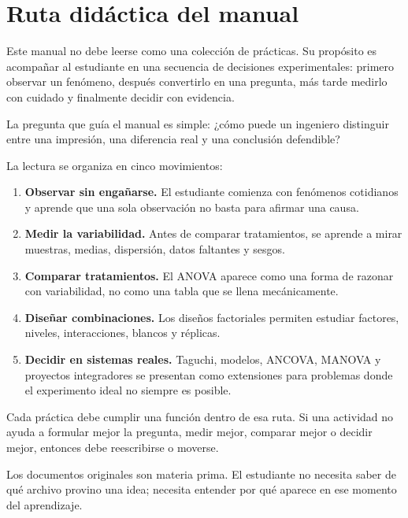 \section*{Ruta didáctica del manual}

Este manual no debe leerse como una colección de prácticas. Su propósito es acompañar al estudiante en una secuencia de decisiones experimentales: primero observar un fenómeno, después convertirlo en una pregunta, más tarde medirlo con cuidado y finalmente decidir con evidencia.

\begin{important}
La pregunta que guía el manual es simple: ¿cómo puede un ingeniero distinguir entre una impresión, una diferencia real y una conclusión defendible?
\end{important}

La lectura se organiza en cinco movimientos:

\begin{enumerate}
\item \textbf{Observar sin engañarse.} El estudiante comienza con fenómenos cotidianos y aprende que una sola observación no basta para afirmar una causa.
\item \textbf{Medir la variabilidad.} Antes de comparar tratamientos, se aprende a mirar muestras, medias, dispersión, datos faltantes y sesgos.
\item \textbf{Comparar tratamientos.} El ANOVA aparece como una forma de razonar con variabilidad, no como una tabla que se llena mecánicamente.
\item \textbf{Diseñar combinaciones.} Los diseños factoriales permiten estudiar factores, niveles, interacciones, blancos y réplicas.
\item \textbf{Decidir en sistemas reales.} Taguchi, modelos, ANCOVA, MANOVA y proyectos integradores se presentan como extensiones para problemas donde el experimento ideal no siempre es posible.
\end{enumerate}

Cada práctica debe cumplir una función dentro de esa ruta. Si una actividad no ayuda a formular mejor la pregunta, medir mejor, comparar mejor o decidir mejor, entonces debe reescribirse o moverse.

\begin{observacion}
Los documentos originales son materia prima. El estudiante no necesita saber de qué archivo provino una idea; necesita entender por qué aparece en ese momento del aprendizaje.
\end{observacion}

\newpage
